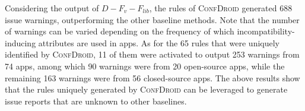 Considering the output of $D-F_{v}-F_{lib}$, the rules of \textsc{ConfDroid} generated 688 issue warnings, outperforming the other baseline methods.
Note that the number of warnings can be varied depending on the frequency of which incompatibility-inducing attributes are used in apps.
As for the 65 rules that were uniquely identified by \textsc{ConfDroid}, 11 of them were activated to output 253 warnings from 74 apps, among which 90 warnings were from 20 open-source apps, while the remaining 163 warnings were from 56 closed-source apps.
The above results show that the rules uniquely generated by \textsc{ConfDroid} can be leveraged to generate issue reports that are unknown to other baselines.

